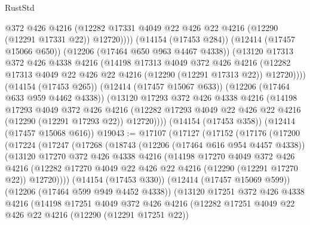 \begin{lexlean}{RustStd}
\begin{coremodule}
{\begin{coremodule}
{{{{{{{{{{{{{{{{{{{{{{{{{{{{{{{{{{{{{{{{{{{{{{{{{{              @372
              @426
              @4216
              (@12282 @17331 @4049 @22 @426 @22 @4216 (@12290 (@12291 @17331 @22)) @12720))))
        (@14154 (@17453 @284))
        (@12414 (@17457 @15066 @650))
        (@12206 (@17464 @650 @963 @4467 @4338))
        (@13120
          @17313
          @372
          @426
          @4338
          @4216
          (@14198
            @17313
            @4049
            @372
            @426
            @4216
            (@12282 @17313 @4049 @22 @426 @22 @4216 (@12290 (@12291 @17313 @22)) @12720))))
      (@14154 (@17453 @265))
      (@12414 (@17457 @15067 @633))
      (@12206 (@17464 @633 @959 @4462 @4338))
      (@13120
        @17293
        @372
        @426
        @4338
        @4216
        (@14198
          @17293
          @4049
          @372
          @426
          @4216
          (@12282 @17293 @4049 @22 @426 @22 @4216 (@12290 (@12291 @17293 @22)) @12720))))
    (@14154 (@17453 @358))
    (@12414 (@17457 @15068 @616))
@19043 := @17107
    (@17127
      (@17152
        (@17176
          (@17200
            (@17224
              (@17247
                (@17268
                  (@18743
                    (@12206 (@17464 @616 @954 @4457 @4338))
                    (@13120
                      @17270
                      @372
                      @426
                      @4338
                      @4216
                      (@14198
                        @17270
                        @4049
                        @372
                        @426
                        @4216
                        (@12282
                          @17270
                          @4049
                          @22
                          @426
                          @22
                          @4216
                          (@12290 (@12291 @17270 @22))
                          @12720))))
                  (@14154 (@17453 @330))
                  (@12414 (@17457 @15069 @599))
                  (@12206 (@17464 @599 @949 @4452 @4338))
                  (@13120
                    @17251
                    @372
                    @426
                    @4338
                    @4216
                    (@14198
                      @17251
                      @4049
                      @372
                      @426
                      @4216
                      (@12282
                        @17251
                        @4049
                        @22
                        @426
                        @22
                        @4216
                        (@12290 (@12291 @17251 @22))
}}}}}}}}}}}}}}}}}}}}}}}}}}}}}}}}}}}}}}}}}}}}}}}}}}
\end{coremodule}}
\end{coremodule}
\end{lexlean}
